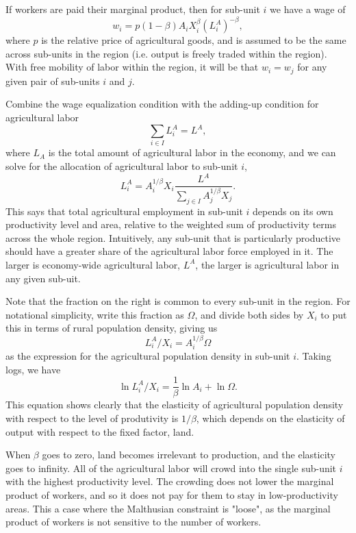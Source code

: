 \documentclass[10pt]{article}
\begin{document}
If workers are paid their marginal product, then for sub-unit $i$ we have a wage of
\begin{equation}
	w_{i} = p (1-\beta) A_{i} X_{i}^{\beta} (L^A_{i})^{-\beta},
\end{equation}
where $p$ is the relative price of agricultural goods, and is assumed to be the same across sub-units in the region (i.e. output is freely traded within the region). With free mobility of labor within the region, it will be that $w_{i} = w_{j}$ for any given pair of sub-units $i$ and $j$.

Combine the wage equalization condition with the adding-up condition for agricultural labor 
\begin{equation}
\sum_{i\in I} L^A_{i} = L^A,
\end{equation}
where $L_A$ is the total amount of agricultural labor in the economy, and we can solve for the allocation of agricultural labor to sub-unit $i$,
\begin{equation}
L^A_{i} = A_{i}^{1/\beta}X_{i} \frac{L^A}{\sum_{j\in I} A_{j}^{1/\beta}X_{j}}.
\end{equation}
This says that total agricultural employment in sub-unit $i$ depends on its own productivity level and area, relative to the weighted sum of productivity terms across the whole region. Intuitively, any sub-unit that is particularly productive should have a greater share of the agricultural labor force employed in it. The larger is economy-wide agricultural labor, $L^A$, the larger is agricultural labor in any given sub-uit.

Note that the fraction on the right is common to every sub-unit in the region. For notational simplicity, write this fraction as $\Omega$, and divide both sides by $X_i$ to put this in terms of rural population density, giving us
\begin{equation}
L^A_{i}/X_i = A_{i}^{1/\beta} \Omega
\end{equation}
as the expression for the agricultural population density in sub-unit $i$. Taking logs, we have
\begin{equation}
\ln L^A_{i}/X_i = \frac{1}{\beta} \ln A_{i} + \ln \Omega. \label{eq_est}
\end{equation}
This equation shows clearly that the elasticity of agricultural population density with respect to the level of produtivity is $1/\beta$, which depends on the elasticity of output with respect to the fixed factor, land.

When $\beta$ goes to zero, land becomes irrelevant to production, and the elasticity goes to infinity. All of the agricultural labor will crowd into the single sub-unit $i$ with the highest productivity level. The crowding does not lower the marginal product of workers, and so it does not pay for them to stay in low-productivity areas. This a case where the Malthusian constraint is "loose", as the marginal product of workers is not sensitive to the number of workers.
\end{document}
